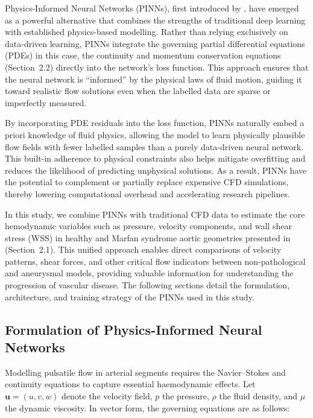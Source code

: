 \documentclass{article}
\begin{document}
Physics-Informed Neural Networks (PINNs), first introduced by \citet{raissi2019physics}, have emerged as a powerful alternative that combines the strengths of traditional deep learning with established physics-based modelling. Rather than relying exclusively on data-driven learning, PINNs integrate the governing partial differential equations (PDEs) in this case, the continuity and momentum conservation equations (Section~2.2) directly into the network's loss function. This approach ensures that the neural network is ``informed'' by the physical laws of fluid motion, guiding it toward realistic flow solutions even when the labelled data are sparse or imperfectly measured.

By incorporating PDE residuals into the loss function, PINNs naturally embed a priori knowledge of fluid physics, allowing the model to learn physically plausible flow fields with fewer labelled samples than a purely data-driven neural network. This built-in adherence to physical constraints also helps mitigate overfitting and reduces the likelihood of predicting unphysical solutions. As a result, PINNs have the potential to complement or partially replace expensive CFD simulations, thereby lowering computational overhead and accelerating research pipelines.

In this study, we combine PINNs with traditional CFD data to estimate the core hemodynamic variables such as pressure, velocity components, and wall shear stress (WSS) in healthy and Marfan syndrome aortic geometries presented in (Section~2.1). This unified approach enables direct comparisons of velocity patterns, shear forces, and other critical flow indicators between non-pathological and aneurysmal models, providing valuable information for understanding the progression of vascular disease. The following sections detail the formulation, architecture, and training strategy of the PINNs used in this study.

\subsection{Formulation of Physics-Informed Neural Networks}
\label{sec:PINN_Formulation}

Modelling pulsatile flow in arterial segments requires the Navier--Stokes and continuity equations to capture essential haemodynamic effects. Let \(\mathbf{u} = (u,v,w)\) denote the velocity field, \(p\) the pressure, \(\rho\) the fluid density, and \(\mu\) the dynamic viscosity. In vector form, the governing equations are as follows:
\end{document}
